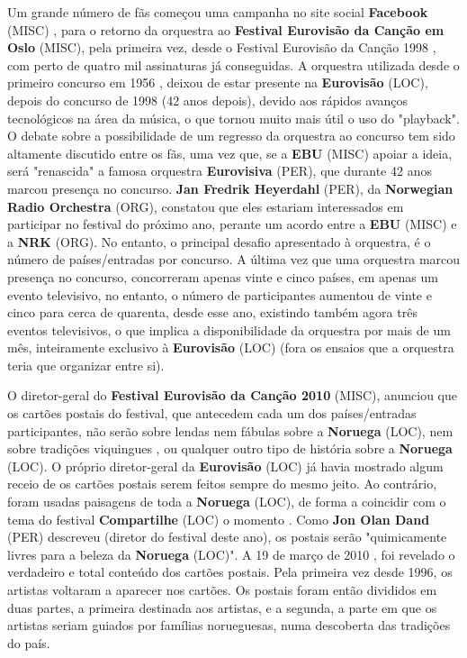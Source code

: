 \documentclass[12pt,a4paper]{article}
\begin{document}
Um grande número de fãs começou uma campanha no site social \textbf{Facebook} (MISC) , para o retorno da orquestra ao \textbf{Festival Eurovisão da Canção em Oslo} (MISC), pela primeira vez, desde o Festival Eurovisão da Canção 1998 , com perto de quatro mil assinaturas já conseguidas. A orquestra utilizada desde o primeiro concurso em 1956 , deixou de estar presente na \textbf{Eurovisão} (LOC), depois do concurso de 1998 (42 anos depois), devido aos rápidos avanços tecnológicos na área da música, o que tornou muito mais útil o uso do "playback". O debate sobre a possibilidade de um regresso da orquestra ao concurso tem sido altamente discutido entre os fãs, uma vez que, se a \textbf{EBU} (MISC) apoiar a ideia, será "renascida" a famosa orquestra \textbf{Eurovisiva} (PER), que durante 42 anos marcou presença no concurso. \textbf{Jan Fredrik Heyerdahl} (PER), da \textbf{Norwegian Radio Orchestra} (ORG), constatou que eles estariam interessados em participar no festival do próximo ano, perante um acordo entre a \textbf{EBU} (MISC) e a \textbf{NRK} (ORG). No entanto, o principal desafio apresentado à orquestra, é o número de países/entradas por concurso. A última vez que uma orquestra marcou presença no concurso, concorreram apenas vinte e cinco países, em apenas um evento televisivo, no entanto, o número de participantes aumentou de vinte e cinco para cerca de quarenta, desde esse ano, existindo também agora três eventos televisivos, o que implica a disponibilidade da orquestra por mais de um mês, inteiramente exclusivo à \textbf{Eurovisão} (LOC) (fora os ensaios que a orquestra teria que organizar entre si).

O diretor-geral do \textbf{Festival Eurovisão da Canção 2010} (MISC), anunciou que os cartões postais do festival, que antecedem cada um dos países/entradas participantes, não serão sobre lendas nem fábulas sobre a \textbf{Noruega} (LOC), nem sobre tradições viquingues , ou qualquer outro tipo de história sobre a \textbf{Noruega} (LOC). O próprio diretor-geral da \textbf{Eurovisão} (LOC) já havia mostrado algum receio de os cartões postais serem feitos sempre do mesmo jeito. Ao contrário, foram usadas paisagens de toda a \textbf{Noruega} (LOC), de forma a coincidir com o tema do festival \textbf{Compartilhe} (LOC) o momento . Como \textbf{Jon Olan Dand} (PER) descreveu (diretor do festival deste ano), os postais serão "quimicamente livres para a beleza da \textbf{Noruega} (LOC)". A 19 de março de 2010 , foi revelado o verdadeiro e total conteúdo dos cartões postais. Pela primeira vez desde 1996, os artistas voltaram a aparecer nos cartões. Os postais foram então divididos em duas partes, a primeira destinada aos artistas, e a segunda, a parte em que os artistas seriam guiados por famílias norueguesas, numa descoberta das tradições do país.
\end{document}
